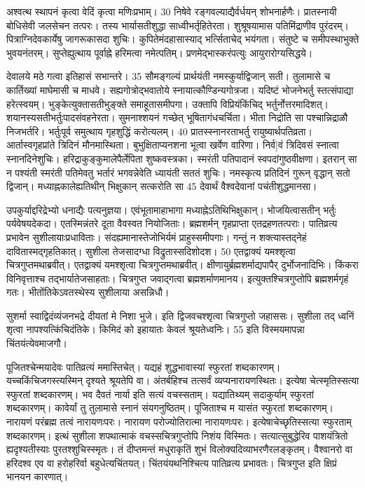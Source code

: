 अश्वत्थ स्थापनं कृत्वा वेदिं कृत्वा मणिःप्रभाम्।
30 निषेवे रङ्गवल्याद्यैर्वर्धयन् शोभनार्हणैः।
 प्रातस्नायी बोधिसेवी जलसेचन तत्परः।
 तस्य भार्यासतीशुद्धा साध्वीभर्तृहितेरता।
 शुश्रूषयामास पतिमिंद्राणीव पुरंदरम्।
 पित्राग्निदेवकार्येषु जागरूकासदा शुचिः।
 कुपितेमंदहासास्याद् भर्त्सिताचेद् भयंगता।
 संतुष्टे च समीपस्थाभुक्ते भुवयनंतरम्।
 सुप्तेह्युत्थाय पूर्वाह्ने हरिमत्वा नमेत्पतिम्।
 प्रणमेद्भास्करंपत्युः आयुरारोग्यसिद्धये।
 
देवालये मठे गत्वा इतिहासं सभान्तरे।
 35 सौमङ्गल्यं प्रार्थयंती नमस्कुर्याद्विजान् सती।
 तुलामासे च कार्तिख्यां माघेमासी च माधवे।
 सह्यगोत्रोद्भवातोये स्नायात्कौण्डिन्यगोत्रजा।
 यदिष्टं भोजनेभर्तु स्तत्संपाद्या हरेत्स्वयम्।
 भुङ्केत्युक्तासतीभुङ्क्ते समाहूतासमीपगा।
 उक्तापि विप्रियंकिंचिद् भर्तुर्नोत्तरमादिशत्।
 शयानस्यसतीभर्तुःपादसंवहनेरता।
 सुमनाश्शयनं गच्छेत् भूषितागंधचर्चिता।
 भीता निद्रोति सा पश्चान्निद्राळौ निजभर्तरि।
 भर्तुःपूर्व समुत्थाय गृहशुद्धिं करोत्यलम्।
 40 प्रातस्स्नानरताभर्तु रायुष्यार्थपतिव्रता।
 आर्तास्वगृहप्रांते त्रिदिनं मौनमास्थिता।
 बुभुक्षिताप्यनशना भूत्वा खर्वेण वारिणा।
 निर्व]वं त्रिदिवसं स्नात्वा स्नानदिनेशुचिः।
 हरिद्राकुङ्कुमालेपैर्लेपिता शुष्कवस्त्रका।
 स्मरंती पतिपादानं स्वपदांगुष्ठवीक्षणा।
 इतरान् सा न पश्यंती स्मरंती पतिमेवतु भर्तारं भगवन्नेवेति ध्यायंती सततं शुचिः।
 नमस्कृत्य प्रतिदिनं गुरून् वृद्धान् सतो द्विजान्।
 मध्याह्नकालेह्यतिथीन् भिक्षुकान् सत्करोति सा 45 देवार्थं वैश्वदेवानां पचंतीशुद्धमानसा।
 
उपकुर्याद्दरिद्रेभ्यो धनाद्यैः पत्यनुज्ञया।
 एवंभूतामाहाभागा मध्याह्नेऽतिथिभिक्षुकान्।
 भोजयित्वासतीन् भर्तुः पर्यवेषयदेकदा।
 एतस्मिन्नंतरे दूता वैवस्वत नियोजिताः।
 ब्रह्मशर्मन् गृहप्राप्ता एतद्रहणतत्पराः।
 पातिव्रत्य प्रभावेन सुशीलायाःप्रधाविताः।
 संदह्यमानास्तेजोभिर्यमं प्राहुस्समीपगाः।
 गन्तुं न शक्त्यास्तद्नेहं दावितास्मद्गृहतिकात्।
 सुशीला तेजसादग्धा विद्रुतास्सदिशोदश।
 50 एतद्वाक्यं यमश्शृत्वा चित्रगुप्तमथाब्रवीत्।
 एतद्वाक्यं यमश्शृत्वा चित्रगुप्तमथाब्रवीत्।
 क्षीणायुर्ब्रह्मशर्माद्यपापैर् दुर्भोजनादिभिः।
 किंकरा विनिवृत्ताश्च तद्भार्यातेजसाहताः।
 चित्रगुप्त जवाद्गत्वा ब्रह्मशर्माणमानय।
 इत्युक्तश्चित्रगुप्तोपि ब्रह्मशर्मगृहं गतः।
 भीतोंतिकेऽवतस्थेस्य सुशीलाया असन्निधौ।
 
सुशर्मा
स्वाद्विदंव्यंजनभद्रे दीयतां मे निशा भुजे।
 इति द्विजवचश्शृत्वा चित्रगुप्तो जहाससः।
 सुशीला तद् ध्वनिं शृत्वा नापश्यत्किंचिदंतिके।
 किमिदं को इहायातः केवलं श्रूयतेध्वनिः।
 55 इति विस्मयमापन्ना चिंतयंत्येवमाजगौ।
 
पूजितश्चेन्मयादेवः पातिव्रत्यं ममास्तिचेत्।
 यद्यहं शुद्धभावास्यां स्फुरतां शब्दकारणम्।
 यच्चकिंचिजगस्त्यस्मिन् दृश्यते श्रूयतेपि वा।
 अंतर्बहिश्च तत्सर्वं व्यप्यनारायणस्थितः।
 इत्येषा चेत्स्मृतिस्सत्या स्फुरतां शब्दकारणम्।
 भव दैवतं नार्या इति सत्यं वचस्सताम्।
 यद्यातिथ्यम् सदाकुर्याम् स्फुरतां शब्दकारणम्।
 कावेर्यां तु तुलामासे स्नानं संयगनुष्ठितम्।
 पूजिताश्च म यासंत स्फुरतां शब्दकारणम्।
 नारायणं परंब्रह्म तत्वं नारायणःपरः।
 नारायण परोज्योतिरात्मा नारायणःपरः।
 इत्येषाचेच्छृतिस्सत्या स्फुरताम् शब्दकारणम्।
 इत्थं सुशीला शपथात्माकं
वचस्सचित्रगुप्तोपि निशंय विस्मितः।
 सत्यात्सुबुद्धेरिव पाशयंत्रितो
ह्यदृश्यतीस्याः पुरतश्शुचिस्स्मृतः।
 तं दीप्तमन्तं मधुराकृतिं
शुभं विलोक्यदिव्याभरणैरलङ्कृतम्।
 वैश्वानरो वा हरिदश्व एव वा
हरोहरिर्वा बहुधेत्यचिंतयत्।
 चिंतयंयथनिश्चित्य पातिव्रत्य प्रभावतः।
 चित्रगुप्त इति क्षिप्रं भानयन कारणात्।
 
